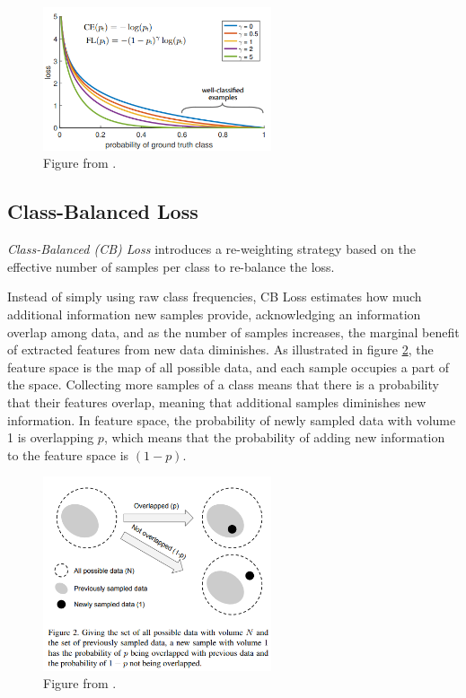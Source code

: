 \begin{figure}[h!]
    \centering
    \includegraphics[width=0.6\textwidth]{Images/focal_loss.png}
    \caption{Figure from \cite{lin2018focallossdenseobject}. }
    \label{fig:focal_loss}
\end{figure}

\subsection{Class-Balanced Loss}
\label{sec:cb_loss}
\emph{Class-Balanced (CB) Loss} \cite{cui2019classbalancedlossbasedeffective} introduces a re-weighting strategy based on the effective number of samples per class to re-balance the loss.

Instead of simply using raw class frequencies, CB Loss estimates how much additional information new samples provide, acknowledging an information overlap among data, and as the number of samples increases, the marginal benefit of extracted features from new data diminishes. As illustrated in figure \ref{fig:cb_featue_space}, the feature space is the map of all possible data, and each sample occupies a part of the space. Collecting more samples of a class means that there is a probability that their features overlap, meaning that additional samples diminishes new information.
In feature space, the probability of newly sampled data with volume 1 is overlapping $p$, which means that the probability of adding new information to the feature space is $(1-p)$. 


\begin{figure}[h!]
    \centering
    \includegraphics[width=0.6\textwidth]{Images/CB_feature_space.png}
    \caption{Figure from \cite{cui2019classbalancedlossbasedeffective}. }
    \label{fig:cb_featue_space}
\end{figure}

